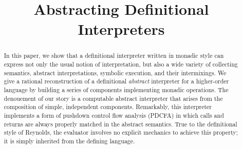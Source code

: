 \documentclass[preprint]{sigplanconf}
\begin{document}

\setlength{\pdfpageheight}{\paperheight}
\setlength{\pdfpagewidth}{\paperwidth}




\title{Abstracting Definitional Interpreters}

\authorinfo{}{}{}

\maketitle

\begin{abstract}
In this paper, we show that a definitional interpreter written in monadic style
can express not only the usual notion of interpretation, but also a wide
variety of collecting semantics, abstract interpretations, symbolic execution,
and their intermixings. We give a rational reconstruction of a definitional
\emph{abstract} interpreter for a higher-order language by building a series of
components implementing monadic operations.  The denouement of our story is a
computable abstract interpreter that arises from the composition of simple,
independent components.  Remarkably, this interpreter implements a form of
pushdown control flow analysis (PDCFA) in which calls and returns are always
properly matched in the abstract semantics.  True to the definitional style of
Reynolds, the evaluator involves no explicit mechanics to achieve this
property; it is simply inherited from the defining language.
\end{abstract}

\end{document}
